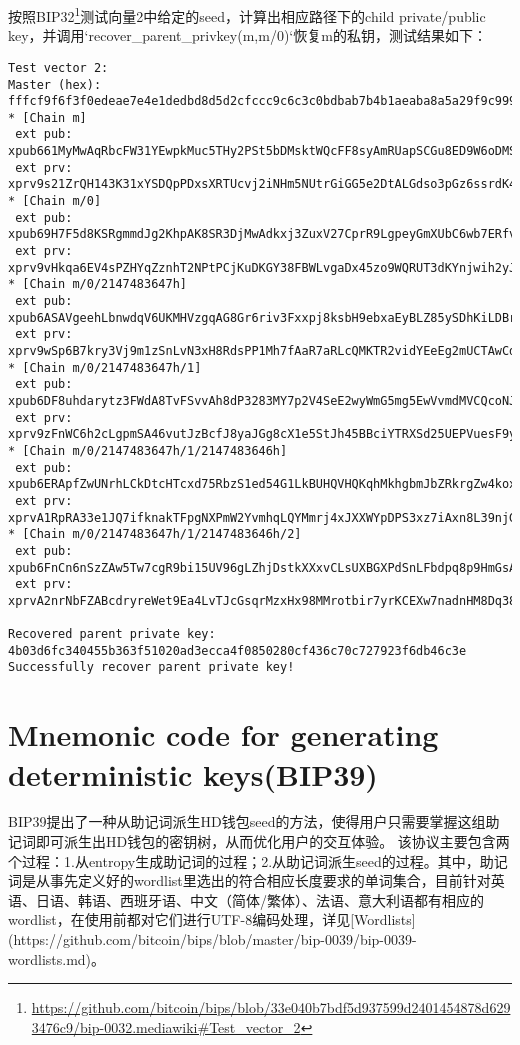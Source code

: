 \documentclass{article}
\begin{document}
按照BIP32\footnote{\url{https://github.com/bitcoin/bips/blob/33e040b7bdf5d937599d2401454878d6293476c9/bip-0032.mediawiki\#Test_vector_2}}测试向量2中给定的seed，计算出相应路径下的child private/public key，并调用`recover_parent_privkey(m,m/0)`恢复m的私钥，测试结果如下：

\begin{lstlisting}
Test vector 2:
Master (hex): fffcf9f6f3f0edeae7e4e1dedbd8d5d2cfccc9c6c3c0bdbab7b4b1aeaba8a5a29f9c999693908d8a8784817e7b7875726f6c696663605d5a5754514e4b484542
* [Chain m]
 ext pub: xpub661MyMwAqRbcFW31YEwpkMuc5THy2PSt5bDMsktWQcFF8syAmRUapSCGu8ED9W6oDMSgv6Zz8idoc4a6mr8BDzTJY47LJhkJ8UB7WEGuduB
 ext prv: xprv9s21ZrQH143K31xYSDQpPDxsXRTUcvj2iNHm5NUtrGiGG5e2DtALGdso3pGz6ssrdK4PFmM8NSpSBHNqPqm55Qn3LqFtT2emdEXVYsCzC2U
* [Chain m/0]
 ext pub: xpub69H7F5d8KSRgmmdJg2KhpAK8SR3DjMwAdkxj3ZuxV27CprR9LgpeyGmXUbC6wb7ERfvrnKZjXoUmmDznezpbZb7ap6r1D3tgFxHmwMkQTPH
 ext prv: xprv9vHkqa6EV4sPZHYqZznhT2NPtPCjKuDKGY38FBWLvgaDx45zo9WQRUT3dKYnjwih2yJD9mkrocEZXo1ex8G81dwSM1fwqWpWkeS3v86pgKt
* [Chain m/0/2147483647h]
 ext pub: xpub6ASAVgeehLbnwdqV6UKMHVzgqAG8Gr6riv3Fxxpj8ksbH9ebxaEyBLZ85ySDhKiLDBrQSARLq1uNRts8RuJiHjaDMBU4Zn9h8LZNnBC5y4a
 ext prv: xprv9wSp6B7kry3Vj9m1zSnLvN3xH8RdsPP1Mh7fAaR7aRLcQMKTR2vidYEeEg2mUCTAwCd6vnxVrcjfy2kRgVsFawNzmjuHc2YmYRmagcEPdU9
* [Chain m/0/2147483647h/1]
 ext pub: xpub6DF8uhdarytz3FWdA8TvFSvvAh8dP3283MY7p2V4SeE2wyWmG5mg5EwVvmdMVCQcoNJxGoWaU9DCWh89LojfZ537wTfunKau47EL2dhHKon
 ext prv: xprv9zFnWC6h2cLgpmSA46vutJzBcfJ8yaJGg8cX1e5StJh45BBciYTRXSd25UEPVuesF9yog62tGAQtHjXajPPdbRCHuWS6T8XA2ECKADdw4Ef
* [Chain m/0/2147483647h/1/2147483646h]
 ext pub: xpub6ERApfZwUNrhLCkDtcHTcxd75RbzS1ed54G1LkBUHQVHQKqhMkhgbmJbZRkrgZw4koxb5JaHWkY4ALHY2grBGRjaDMzQLcgJvLJuZZvRcEL
 ext prv: xprvA1RpRA33e1JQ7ifknakTFpgNXPmW2YvmhqLQYMmrj4xJXXWYpDPS3xz7iAxn8L39njGVyuoseXzU6rcxFLJ8HFsTjSyQbLYnMpCqE2VbFWc
* [Chain m/0/2147483647h/1/2147483646h/2]
 ext pub: xpub6FnCn6nSzZAw5Tw7cgR9bi15UV96gLZhjDstkXXxvCLsUXBGXPdSnLFbdpq8p9HmGsApME5hQTZ3emM2rnY5agb9rXpVGyy3bdW6EEgAtqt
 ext prv: xprvA2nrNbFZABcdryreWet9Ea4LvTJcGsqrMzxHx98MMrotbir7yrKCEXw7nadnHM8Dq38EGfSh6dqA9QWTyefMLEcBYJUuekgW4BYPJcr9E7j

Recovered parent private key: 4b03d6fc340455b363f51020ad3ecca4f0850280cf436c70c727923f6db46c3e
Successfully recover parent private key!
\end{lstlisting}

\section{Mnemonic code for generating deterministic keys(BIP39)}
BIP39提出了一种从助记词派生HD钱包seed的方法，使得用户只需要掌握这组助记词即可派生出HD钱包的密钥树，从而优化用户的交互体验。  
该协议主要包含两个过程：1.从entropy生成助记词的过程；2.从助记词派生seed的过程。其中，助记词是从事先定义好的wordlist里选出的符合相应长度要求的单词集合，目前针对英语、日语、韩语、西班牙语、中文（简体/繁体）、法语、意大利语都有相应的wordlist，在使用前都对它们进行UTF-8编码处理，详见[Wordlists](https://github.com/bitcoin/bips/blob/master/bip-0039/bip-0039-wordlists.md)。
\end{document}
